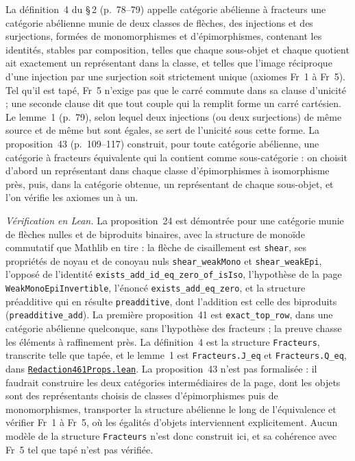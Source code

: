La définition~4 du \S\,2 (p.~78--79) appelle catégorie abélienne à fracteurs une catégorie
abélienne munie de deux classes de flèches, des injections et des surjections, formées de
monomorphismes et d'épimorphismes, contenant les identités, stables par composition, telles que
chaque sous-objet et chaque quotient ait exactement un représentant dans la classe, et telles
que l'image réciproque d'une injection par une surjection soit strictement unique (axiomes
Fr~1 à Fr~5). Tel qu'il est tapé, Fr~5 n'exige pas que le carré commute dans sa clause
d'unicité ; une seconde clause dit que tout couple qui la remplit forme un carré cartésien.
Le lemme~1 (p.~79), selon lequel deux injections (ou deux surjections) de même source et de
même but sont égales, se sert de l'unicité sous cette forme. La proposition~43 (p.~109--117)
construit, pour toute catégorie abélienne, une catégorie à fracteurs équivalente qui la contient
comme sous-catégorie : on choisit d'abord un représentant dans chaque classe d'épimorphismes à
isomorphisme près, puis, dans la catégorie obtenue, un représentant de chaque sous-objet, et
l'on vérifie les axiomes un à un.

\begin{sloppypar}
\noindent\emph{Vérification en Lean.} La proposition~24 est démontrée pour une catégorie
munie de flèches nulles et de biproduits binaires, avec la structure de monoïde commutatif que
Mathlib en tire : la flèche de cisaillement est \texttt{shear}, ses propriétés de noyau et de
conoyau nuls \texttt{shear\_weakMono} et \texttt{shear\_weakEpi}, l'opposé de l'identité
\texttt{exists\_add\_id\_eq\_zero\_of\_isIso}, l'hypothèse de la page
\texttt{WeakMonoEpiInvertible}, l'énoncé \texttt{exists\_add\_eq\_zero}, et la structure
préadditive qui en résulte \texttt{preadditive}, dont l'addition est celle des biproduits
(\texttt{preadditive\_add}). La première proposition~41 est \texttt{exact\_top\_row}, dans une
catégorie abélienne quelconque, sans l'hypothèse des fracteurs ; la preuve chasse les éléments à
raffinement près. La définition~4 est la structure \texttt{Fracteurs}, transcrite telle que
tapée, et le lemme~1 est \texttt{Fracteurs.\allowbreak{}J\_eq} et
\texttt{Fracteurs.\allowbreak{}Q\_eq}, dans
\href{\leanblobmain/Redaction461Props.lean}{\texttt{Redaction461\allowbreak{}Props.\allowbreak{}lean}}.
La proposition~43 n'est pas formalisée : il faudrait construire les deux catégories
intermédiaires de la page, dont les objets sont des représentants choisis de classes
d'épimorphismes puis de monomorphismes, transporter la structure abélienne le long de
l'équivalence et vérifier Fr~1 à Fr~5, où les égalités d'objets interviennent explicitement.
Aucun modèle de la structure \texttt{Fracteurs} n'est donc construit ici, et sa cohérence avec
Fr~5 tel que tapé n'est pas vérifiée.
\end{sloppypar}


